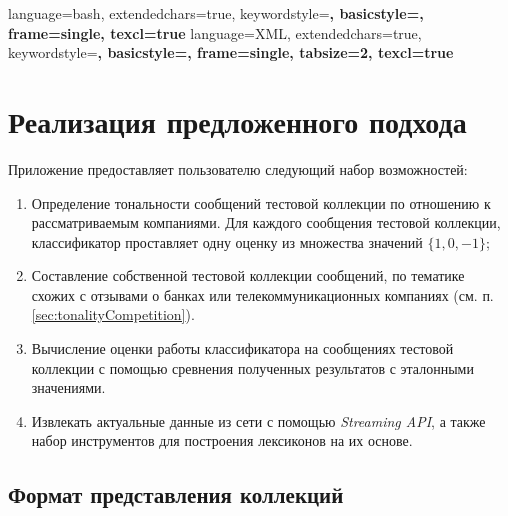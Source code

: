{
    language=bash,
    extendedchars=true,
    keywordstyle=\bfseries,
    basicstyle=\footnotesize,
    frame=single,
    texcl=true
}
{
    language=XML,
    extendedchars=true,
    keywordstyle=\bfseries,
    basicstyle=\footnotesize,
    frame=single,
    tabsize=2,
    texcl=true
}
\newcommand\xml{{\it XML }}

\newpage
\section{Реализация предложенного подхода}
    Приложение предоставляет пользователю следующий набор возможностей:
    \begin{enumerate}
        \item Определение тональности сообщений тестовой коллекции по отношению к
        рассматриваемым компаниями. Для каждого сообщения тестовой коллекции,
        классификатор проставляет одну оценку из множества значений $\{1, 0, -1\}$;
        \item Составление собственной тестовой коллекции сообщений, по тематике
        схожих с отзывами о банках или телекоммуникационных компаниях
        (см. п. \ref{sec:tonalityCompetition}).
        \item Вычисление оценки работы классификатора на сообщениях тестовой
        коллекции с помощью сревнения полученных результатов с эталонными значениями.
        \item Извлекать актуальные данные из сети \twitter с помощью
        {\it Streaming API}, а также набор инструментов для построения лексиконов
        на их основе.
    \end{enumerate}

    \subsection{Формат представления коллекций}

